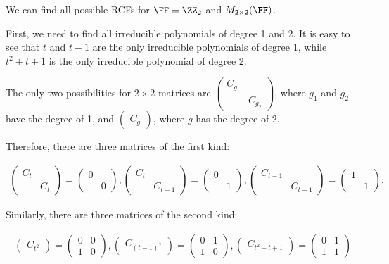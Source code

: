 \documentclass[11pt]{scrartcl}
\begin{document}
\begin{example}

  We can find all possible RCFs for $\FF = \ZZ_2$ and $M_{2\times 2}(\FF)$.

  First, we need to find all irreducible polynomials of degree 1 and
  2. It is easy to see that $t$ and $t-1$ are the only irreducible
  polynomials of degree 1, while $t^2+t+1$ is the only irreducible
  polynomial of degree 2.

The only two possibilities for $2\times2$ matrices are $
\begin{pmatrix}
C_{g_1} & \\
& C_{g_2}
\end{pmatrix}
$, where $g_1$ and $g_2$ have the degree of 1, and $
\begin{pmatrix}
C_g
\end{pmatrix}$, where $g$ has the degree of 2.

Therefore, there are three matrices of the first kind:

\begin{align}
  \begin{pmatrix}
C_t & \\
 & C_t
  \end{pmatrix} = 
   \begin{pmatrix}
0 & \\
& 0
   \end{pmatrix}, 
  \begin{pmatrix}
C_t & \\
& C_{t-1}
  \end{pmatrix} = 
  \begin{pmatrix}
0 & \\
& 1 
  \end{pmatrix},
  \begin{pmatrix}
C_{t-1} & \\
& C_{t-1}
  \end{pmatrix} = 
  \begin{pmatrix}
1 & \\
& 1
  \end{pmatrix}.
\end{align}

Similarly, there are three matrices of the second kind:

\begin{align}
  \begin{pmatrix}
C_{t^2}
  \end{pmatrix}=
  \begin{pmatrix}
0 & 0\\
1 & 0
  \end{pmatrix},
    \begin{pmatrix}
C_{(t-1)^2}
    \end{pmatrix} = 
    \begin{pmatrix}
0 & 1 \\
1 & 0
    \end{pmatrix}, 
    \begin{pmatrix}
C_{t^2+t+1}
    \end{pmatrix}=
    \begin{pmatrix}
0 & 1 \\
1 & 1
    \end{pmatrix}
\end{align}
\end{example}
\end{document}
